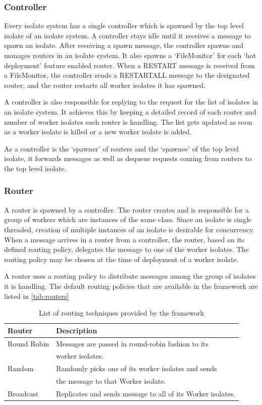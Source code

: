   \subsubsection{Controller}
  Every isolate system has a single controller which is spawned by the top level isolate of an isolate system. A controller stays idle until it receives a message to spawn an isolate. After receiving a spawn message, the controller spawns and manages routers in an isolate system. It also spawns a ‘FileMonitor’ for each ‘hot deployment’ feature enabled router. When a RESTART message is received from a FileMonitor, the controller sends a RESTART\textunderscore{}ALL message to the designated router, and the router restarts all worker isolates it has spawned.

  A controller is also responsible for replying to the request for the list of isolates in an isolate system. It achieves this by keeping a detailed record of each router and number of worker isolates each router is handling. The list gets updated as soon as a worker isolate is killed or a new worker isolate is added.

  As a controller is the ‘spawner’ of routers and the ‘spawnee’ of the top level isolate, it forwards messages as well as dequeue requests coming from routers to the top level isolate.

  \subsubsection{Router}
  \label{subsubsec:router}
  A router is spawned by a controller. The router creates and is responsible for a group of workers which are instances of the same class. Since an isolate is single threaded, creation of multiple instances of an isolate is desirable for concurrency. When a message arrives in a router from a controller, the router, based on its defined routing policy, delegates the message to one of the worker isolates. The routing policy may be chosen at the time of deployment of a worker isolate.

  A router uses a routing policy to distribute messages among the group of isolates it is handling. The default routing policies that are available in the framework are listed in \autoref{tab:routers}
\begin{table}[htsb]
  \caption[Routing techniques provided by the framework]{List of routing techniques provided by the framework}\label{tab:routers}
  \centering
  \begin{tabular}{l l}
    \toprule
      \bf{Router} & \bf{Description} \\
    \midrule
      Round Robin & Messages are passed in round-robin fashion to its \\ & worker isolates.\\
      Random & Randomly picks one of its worker isolates and sends\\ & the message to that Worker isolate.\\
      Broadcast & Replicates and sends message to all of its Worker isolates.\\
    \bottomrule
  \end{tabular}
\end{table}

